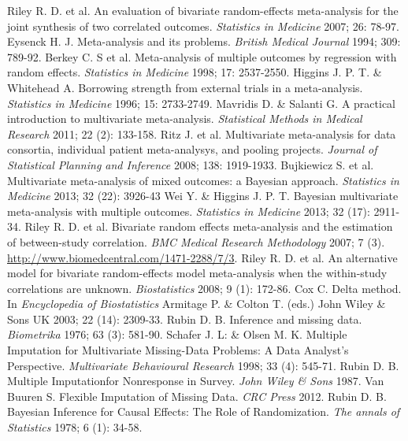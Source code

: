 \documentclass[a4paper,openright,12pt]{report}
\begin{document}
\begin{thebibliography}{99}
 Riley R. D. et al. An evaluation of bivariate random-effects meta-analysis for the joint synthesis of two correlated outcomes. \textit{Statistics in Medicine} 2007; 26: 78-97.
 Eysenck H. J. Meta-analysis and its problems. \textit{British Medical Journal} 1994; 309: 789-92.
 Berkey C. S et al. Meta-analysis of multiple outcomes by regression with random effects. \textit{Statistics in Medicine} 1998; 17: 2537-2550. 
 Higgins J. P. T. \& Whitehead A. Borrowing strength from external trials in a meta-analysis. \textit{Statistics in Medicine} 1996; 15: 2733-2749.
 Mavridis D. \& Salanti G. A practical introduction to multivariate meta-analysis. \textit{Statistical Methods in Medical Research} 2011; 22 (2): 133-158.
 Ritz J. et al. Multivariate meta-analysis for data consortia, individual patient meta-analysys, and pooling projects. \textit{Journal of Statistical Planning and Inference} 2008; 138: 1919-1933.
 Bujkiewicz S. et al. Multivariate meta-analysis of mixed outcomes: a Bayesian approach. \textit{Statistics in Medicine} 2013; 32 (22): 3926-43
 Wei Y. \& Higgins J. P. T. Bayesian multivariate meta-analysis with multiple outcomes. \textit{Statistics in Medicine} 2013; 32 (17): 2911-34.
 Riley R. D. et al. Bivariate random effects meta-analysis and the estimation of between-study correlation. \textit{BMC Medical Research Methodology} 2007; 7 (3). \url{http://www.biomedcentral.com/1471-2288/7/3}.
 Riley R. D. et al. An alternative model for bivariate random-effects model meta-analysis when the within-study correlations are unknown. \textit{Biostatistics} 2008; 9 (1): 172-86. 
 Cox C. Delta method. In \textit{Encyclopedia of Biostatistics} Armitage P. \& Colton T. (eds.) John Wiley \& Sons UK 2003; 22 (14): 2309-33.
 Rubin D. B. Inference and missing data. \textit{Biometrika} 1976; 63 (3): 581-90.
 Schafer J. L: \& Olsen M. K. Multiple Imputation for Multivariate Missing-Data Problems: A Data Analyst's Perspective. \textit{Multivariate Behavioural Research} 1998; 33 (4): 545-71. 
 Rubin D. B. Multiple Imputationfor Nonresponse in Survey. \textit{John Wiley \& Sons} 1987.
 Van Buuren S. Flexible Imputation of Missing Data. \textit{CRC Press} 2012.
 Rubin D. B. Bayesian Inference for Causal Effects: The Role of Randomization. \textit{The annals of Statistics} 1978; 6 (1): 34-58.

\end{thebibliography}
\end{document}
